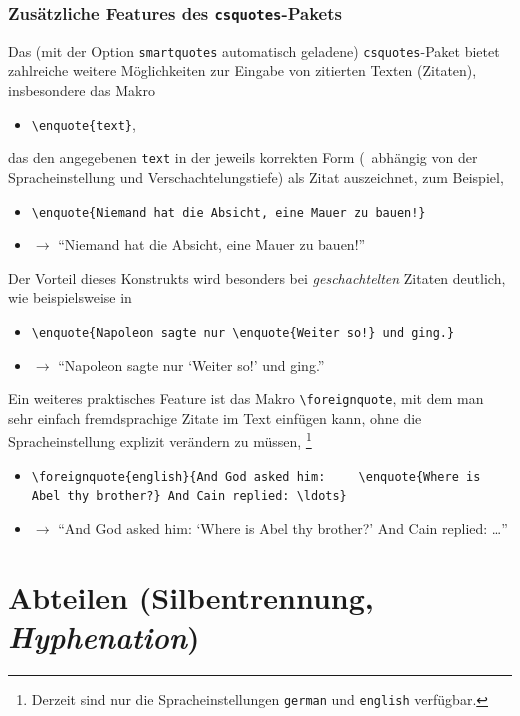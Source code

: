 \subsubsection{Zusätzliche Features des \texttt{csquotes}-Pakets}

Das (mit der Option \texttt{smartquotes} automatisch geladene)
\texttt{csquotes}-Paket bietet zahlreiche weitere Möglichkeiten zur Eingabe
von zitierten Texten (Zitaten), insbesondere das Makro
%
\begin{itemize}
    \item[] \verb!\enquote{text}!,
\end{itemize}
%
das den angegebenen \texttt{text} in der jeweils korrekten Form (\ua\
abhängig von der Sprach\-einstellung und Verschachtelungstiefe) als Zitat
auszeichnet, zum Beispiel,
%
\begin{itemize}
    \item[] \verb|\enquote{Niemand hat die Absicht, eine Mauer zu bauen!}|
    \item[] $\rightarrow$ \enquote{Niemand hat die Absicht, eine Mauer zu
    bauen!}
\end{itemize}
%
Der Vorteil dieses Konstrukts wird besonders bei \emph{geschachtelten}
Zitaten deutlich, wie beispielsweise in
%
\begin{itemize}
    \item[] \verb|\enquote{Napoleon sagte nur \enquote{Weiter so!} und ging.}|
    \item[] $\rightarrow$ \enquote{Napoleon sagte nur \enquote{Weiter so!}
    und ging.}
\end{itemize}
%
Ein weiteres praktisches Feature ist das Makro \verb!\foreignquote!, mit dem
man sehr einfach fremdsprachige Zitate im Text einfügen kann, ohne die
Spracheinstellung explizit verändern zu müssen, \zB%
\footnote{Derzeit sind nur die Spracheinstellungen \texttt{german} und
\texttt{english} verfügbar.}
%
\begin{itemize}
    \item[] \verb|\foreignquote{english}{And God asked him: |\newline
    \verb|   \enquote{Where is Abel thy brother?} And Cain replied: \ldots}|
    \item[] $\rightarrow$ \foreignquote{english}{And God asked him:
    \enquote{Where is Abel thy brother?} And Cain replied: \ldots}
\end{itemize}


\section{Abteilen (Silbentrennung, \emph{Hyphenation})}
\label{subsec:layout-abteilen}

